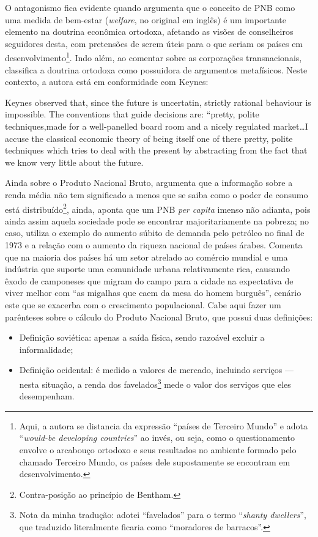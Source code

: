 	O antagonismo fica evidente quando  argumenta que o conceito de PNB como uma medida de bem-estar (\textit{welfare}, no original em inglês) é um importante elemento na doutrina econômica ortodoxa, afetando as visões de conselheiros seguidores desta, com pretensões de serem úteis para o que seriam os países em desenvolvimento\footnote{Aqui, a autora se distancia da expressão ``países de Terceiro Mundo'' e adota ``\textit{would-be developing countries}'' ao invés, ou seja, como o questionamento envolve o arcabouço ortodoxo e seus resultados no ambiente formado pelo chamado Terceiro Mundo, os países dele supostamente se encontram em desenvolvimento.}. Indo além, ao comentar sobre as corporações transnacionais, classifica a doutrina ortodoxa como possuidora de argumentos metafísicos. Neste contexto, a autora está em conformidade com Keynes:
	
	\begin{citacao}
		Keynes observed that, since the future is uncertatin, strictly rational behaviour is impossible. The conventions that guide decisions are: ``pretty, polite techniques,made for a well-panelled board room and a nicely regulated market\dots I accuse the classical economic theory of being itself one of there pretty, polite techniques which tries to deal with the present by abstracting from the fact that we know very little about the future.
	\end{citacao}
	
	Ainda sobre o Produto Nacional Bruto,  argumenta que a informação sobre a renda média não tem significado a menos que se saiba como o poder de consumo está distribuído\footnote{Contra-posição ao princípio de Bentham.}, ainda,  aponta que um PNB \textit{per capita} imenso não adianta, pois ainda assim aquela sociedade pode se encontrar majoritariamente na pobreza; no caso, utiliza o exemplo do aumento súbito de demanda pelo petróleo no final de 1973 e a relação com o aumento da riqueza nacional de países árabes. Comenta que na maioria dos países há um setor atrelado ao comércio mundial e uma indústria que suporte uma comunidade urbana relativamente rica, causando êxodo de camponeses que migram do campo para a cidade na expectativa de viver melhor com ``as migalhas que caem da mesa do homem burguês'', cenário este que se exacerba com o crescimento populacional. Cabe aqui fazer um parênteses sobre o cálculo do Produto Nacional Bruto, que possui duas definições:
	\begin{itemize}
		\item Definição soviética: apenas a saída física, sendo razoável excluir a informalidade;
		\item Definição ocidental: é medido a valores de mercado, incluindo serviços — nesta situação, a renda dos favelados\footnote{Nota da minha tradução: adotei ``favelados'' para o termo ``\textit{shanty dwellers}'', que traduzido literalmente ficaria como ``moradores de barracos''.} mede o valor dos serviços que eles desempenham.
	\end{itemize}
	
